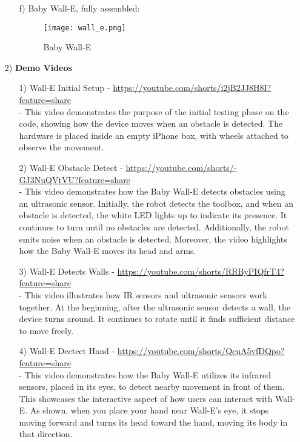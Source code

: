 \documentclass[12pt]{article}
\begin{document}
\begin{itemize}
\begin{itemize}
\begin{itemize}
        \end{itemize}
        \item[f)] Baby Wall-E, fully assembled:
        \begin{figure}[H]
            \centering
            \texttt{[image: wall\_e.png]}
            \caption{Baby Wall-E}
            \label{fig:battery}
        \end{figure}
        
    \end{itemize}
    \item[2)] \textbf{Demo Videos}
    \begin{itemize}
        \item[1)] Wall-E Initial Setup - \href{https://youtube.com/shorts/i2jB2JJ8H8I?feature=share}{https://youtube.com/shorts/i2jB2JJ8H8I?feature=share}
        \\- This video demonstrates the purpose of the initial testing phase on the code, showing how the device moves when an obstacle is detected. The hardware is placed inside an empty iPhone box, with wheels attached to observe the movement.
        
        \item[2)] Wall-E Obstacle Detect - \href{https://youtube.com/shorts/-GJ3NuQVtVU?feature=share}{https://youtube.com/shorts/-GJ3NuQVtVU?feature=share}
        \\- This video demonstrates how the Baby Wall-E detects obstacles using an ultrasonic sensor. Initially, the robot detects the toolbox, and when an obstacle is detected, the white LED lights up to indicate its presence. It continues to turn until no obstacles are detected. Additionally, the robot emits noise when an obstacle is detected. Moreover, the video highlights how the Baby Wall-E moves its head and arms.
        
        \item[3)] Wall-E Detects Walls - \href{https://youtube.com/shorts/RRByPIQfrT4?feature=share}{https://youtube.com/shorts/RRByPIQfrT4?feature=share}
        \\- This video illustrates how IR sensors and ultrasonic sensors work together. At the beginning, after the ultrasonic sensor detects a wall, the device turns around. It continues to rotate until it finds sufficient distance to move freely.
        
        \item[4)] Wall-E Dectect Hand - \href{https://youtube.com/shorts/QcuA5vfDQpo?feature=share}{https://youtube.com/shorts/QcuA5vfDQpo?feature=share}
        \\- This video demonstrates how the Baby Wall-E utilizes its infrared sensors, placed in its eyes, to detect nearby movement in front of them. This showcases the interactive aspect of how users can interact with Wall-E. As shown, when you place your hand near Wall-E's eye, it stops moving forward and turns its head toward the hand, moving its body in that direction.
    \end{itemize}


\end{itemize}
\end{document}

